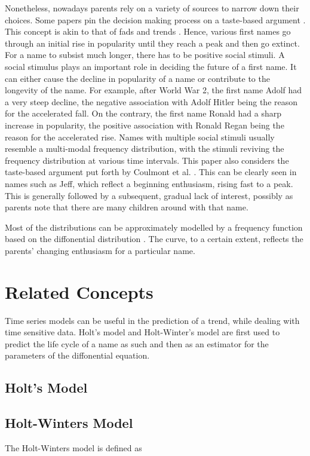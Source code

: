 \documentclass[letterpaper,10pt]{article}
\begin{document}
Nonetheless, nowadays parents rely on a variety of sources to narrow down their choices. Some papers pin the decision making process on a taste-based argument \cite{2}. This concept is akin to that of fads \cite{fad definition} and trends \cite{trend definition}. Hence, various first names go through an initial rise in popularity until they reach a peak and then go extinct. For a name to subsist much longer, there has to be positive social stimuli\cite{define social stimulus}. A social stimulus plays an important role in deciding the future of a first name. It can either cause the decline in popularity of a name or contribute to the longevity of the name. For example, after World War 2, the first name Adolf had a very steep decline, the negative association with Adolf Hitler being the reason for the accelerated fall. On the contrary, the first name Ronald had a sharp increase in popularity, the positive association with Ronald Regan being the reason for the accelerated rise. Names with multiple social stimuli usually resemble a multi-modal frequency distribution, with the stimuli reviving the frequency distribution at various time intervals.
This paper also considers the taste-based argument put forth by Coulmont et al. \cite{2}. This can be clearly seen in names such as Jeff, which reflect a beginning enthusiasm, rising fast to a peak. This is generally followed by a subsequent, gradual lack of interest, possibly as parents note that there are many children around with that name.


Most of the distributions can be approximately modelled by a frequency function based on the diffonential distribution \cite{preston}. The curve, to a certain extent, reflects the parents' changing enthusiasm for a particular name.
 
\section{Related Concepts}
Time series models can be useful in the prediction of a trend, while dealing with time sensitive data. Holt's model and Holt-Winter's model are first used to predict the life cycle of a name as such and then as an estimator for the parameters of the diffonential equation.

\subsection{Holt's Model}


\subsection{Holt-Winters Model}
The Holt-Winters model is defined as
\end{document}
